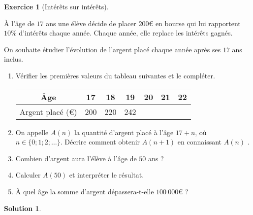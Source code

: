 \documentclass[12pt]{paper}
\theoremstyle{plain}
\newtheorem*{sol}{Solution}
\theoremstyle{definition}
\newtheorem{ex}{Exercice}
\newcommand{\exe}[2]{
		\begin{ex} #1  \end{ex}
		\begin{sol} #2 \end{sol}
	}
\newcommand{\exe}[2]{
		\begin{ex} #1  \end{ex}
	}
\begin{document}
\exe{[Intérêts sur intérêts]\label{ex:2}

	À l'âge de $17$ ans une élève décide de placer $200$€ en bourse qui lui rapportent $10\%$ d'intérêts chaque année.
	Chaque année, elle replace les intérêts gagnés.
	
	On souhaite étudier l'évolution de l'argent placé chaque année après ses $17$ ans inclus.
	\begin{enumerate}
		\item Vérifier les premières valeurs du tableau suivantes et le compléter.
			\begin{center}
			\begin{tabular}{|c|c|c|c|c|c|c|}\hline
				Âge & 17 & 18 & 19 & 20 & 21 & 22 \\ \hline
				Argent placé (€) & 200 & 220 & 242 & & &  \\ \hline
			\end{tabular}
			\end{center}
		\item On appelle $A(n)$ la quantité d'argent placé à l'âge $17+n$, où $n\in \{0 ; 1 ; 2; \dots \}$.
		Décrire comment obtenir $A(n+1)$ en connaissant $A(n)$
		.%
		
		\item Combien d'argent aura l'élève à l'âge de $50$ ans ? 
		\item Calculer $A(50)$ et interpréter le résultat.
		\item À quel âge la somme d'argent dépassera-t-elle $100 \  000$€ ?		
	\end{enumerate}
 }{}
 
\end{document}

